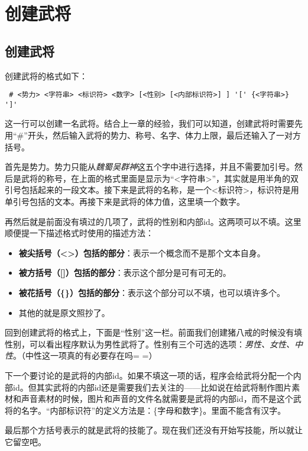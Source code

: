 \chapter{创建武将}

\section{创建武将}

创建武将的格式如下： \\

\begin{verbatim}
 # <势力> <字符串> <标识符> <数字> [<性别> [<内部标识符>] ] '[' {<字符串>} ']'
\end{verbatim}

这一行可以创建一名武将。结合上一章的经验，我们可以知道，创建武将时需要先用“\#”开头，然后输入武将的势力、称号、名字、体力上限，最后还输入了一对方括号。

首先是势力。势力只能从\emph{魏蜀吴群神}这五个字中进行选择，并且不需要加引号。然后是武将的称号，在上面的格式里面是显示为“<字符串>”，其实就是用半角的双引号包括起来的一段文本。接下来是武将的名称，是一个<标识符>，标识符是用单引号包括的文本。再接下来是武将的体力值，这里填一个数字。

再然后就是前面没有填过的几项了，武将的性别和内部id。这两项可以不填。这里顺便提一下描述格式时使用的描述方法：

\begin{itemize}
 \item \textbf{被尖括号（<>）包括的部分}：表示一个概念而不是那个文本自身。
 \item \textbf{被方括号（[]）包括的部分}：表示这个部分是可有可无的。
 \item \textbf{被花括号（\{\}）包括的部分}：表示这个部分可以不填，也可以填许多个。
 \item 其他的就是原文照抄了。
\end{itemize}

回到创建武将的格式上，下面是“性别”这一栏。前面我们创建猪八戒的时候没有填性别，可以看出程序默认为男性武将了。性别有三个可选的选项：\emph{男性、女性、中性}。（中性这一项真的有必要存在吗= =）

下一个要讨论的是武将的内部id。如果不填这一项的话，程序会给武将分配一个内部id。但其实武将的内部id还是需要我们去关注的——比如说在给武将制作图片素材和声音素材的时候，图片和声音的文件名就需要是武将的内部id，而不是这个武将的名字。“内部标识符”的定义方法是：\{字母和数字\}。里面不能含有汉字。

最后那个方括号表示的就是武将的技能了。现在我们还没有开始写技能，所以就让它留空吧。\\

